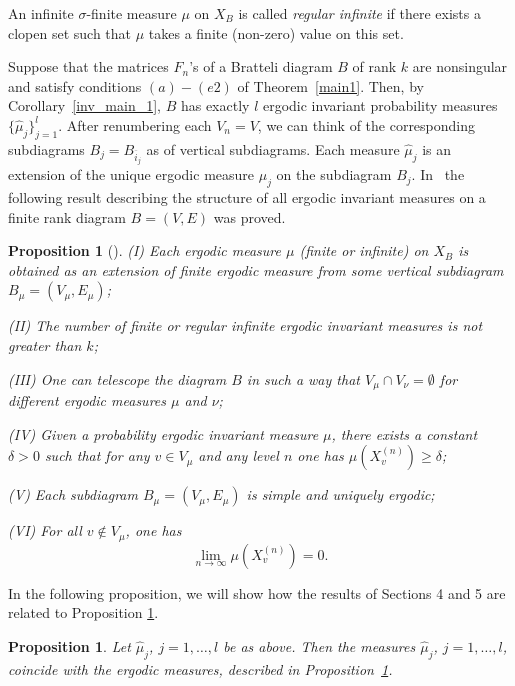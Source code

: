 \documentclass[11pt, english, reqno]{amsart}
\theoremstyle{definition}
\theoremstyle{remark}
\theoremstyle{plain}
\newtheorem{prop}[defin]{Proposition}
\def\ov{\overline}
\def\wh{\widehat}
\numberwithin{equation}{section}
\begin{document}
{An infinite $\sigma$-finite measure $\mu$ on $X_B$ is called \textit{regular
infinite} if there exists a clopen set such that $\mu$ takes a finite
(non-zero) value on this set.

Suppose that the  matrices $F_n$'s of a Bratteli diagram $B$ of rank $k$ are nonsingular and satisfy conditions $(a)-(e2)$ of Theorem~\ref{main1}. Then, by Corollary~\ref{inv_main_1}, 
$B$ has exactly $l$ ergodic invariant probability measures 
$\{\wh{\mu}_j\}_{j = 1}^l$. After renumbering each $V_n = V$, we can 
think of the corresponding subdiagrams $B_j = B_{\ov i_j}$ as of 
vertical subdiagrams. Each measure $\wh{\mu}_j$ is an extension of the 
unique ergodic measure ${\mu}_j$ on the subdiagram $B_j$.
In~\cite[Theorem 3.3]{BezuglyiKwiatkowskiMedynetsSolomyak2013} the
 following result describing the structure of all ergodic invariant measures on
 a finite rank diagram $B = (V,E)$ was proved.

\begin{prop}[\cite{BezuglyiKwiatkowskiMedynetsSolomyak2013}]
\label{1.6c}
(I) Each ergodic measure $\mu$ (finite or infinite) on $X_B$ is obtained as
an extension of finite ergodic measure from some vertical subdiagram
$B_{\mu} = (V_{\mu},E_{\mu})$;

(II) The number of finite or regular infinite ergodic invariant measures is not
greater than $k$;

(III) One can telescope the diagram $B$ in such a way that $V_{\mu} \cap
V_{\nu} = \emptyset$ for different ergodic measures $\mu$ and $\nu$;

(IV) Given a probability ergodic invariant measure $\mu$, there exists a
constant $\delta > 0$ such that for any $v \in V_{\mu}$ and any level $n$
one has $\mu(X_v^{(n)}) \geq \delta$;

(V) Each subdiagram $B_{\mu} = (V_{\mu},E_{\mu})$ is simple and uniquely
ergodic;

(VI) For all $v \notin V_\mu$, one has
$$
\lim_{n \rightarrow \infty} \mu(X_v^{(n)}) = 0.
$$

\end{prop}

In the following proposition, we will show how the results of Sections 4 and
5 are related to Proposition \ref{1.6c}. 


\begin{prop}\label{connect_BKMS13} 
Let $\wh{\mu}_j$, $j = 1,\ldots,l$ be as above. Then the measures 
$\wh{\mu}_j$, $j = 1,\ldots,l$, coincide with the ergodic measures, 
described in Proposition~\ref{1.6c}.
\end{prop}

}
\end{document}
